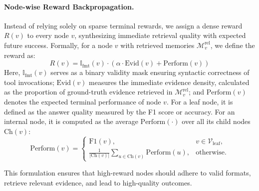 \documentclass[11pt, a4paper]{lumia}
\begin{document}
\paragraph{Node-wise Reward Backpropagation.}
Instead of relying solely on sparse terminal rewards, we assign a dense reward $R(v)$ to every node $v$, synthesizing immediate retrieval quality with expected future success. Formally, for a node $v$ with retrieved memories $\mathcal{M}^{\text{rel}}_v$, we define the reward as:
\begin{equation}
R(v) = \mathbb{I}_{\text{fmt}}(v) \cdot \left( \alpha \cdot \text{Evid}(v) +  \text{Perform}(v) \right)
\end{equation}
Here, $\mathbb{I}_{\text{fmt}}(v)$ serves as a binary validity mask ensuring syntactic correctness of tool invocations; $\text{Evid}(v)$ measures the immediate evidence density, calculated as the proportion of ground-truth evidence retrieved in $\mathcal{M}^{\text{rel}}_v$; and $\text{Perform}(v)$ denotes the expected terminal performance of node $v$. For a leaf node, it is defined as the answer quality measured by the F1 score or accuracy. For an internal node, it is computed as the average $\text{Perform}(\cdot)$ over all its child nodes $\mathrm{Ch}(v)$:
$$
\text{Perform}(v) = 
\begin{cases}
\mathrm{F1}(v), & v \in \mathcal{V}_{\text{leaf}}, \\
\frac{1}{|\mathrm{Ch}(v)|} \displaystyle\sum_{u \in \mathrm{Ch}(v)} \mathrm{Perform}(u), 
& \text{otherwise}.
\end{cases}
$$

This formulation ensures that high-reward nodes should adhere to valid formats, retrieve relevant evidence, and lead to high-quality outcomes.
\end{document}
